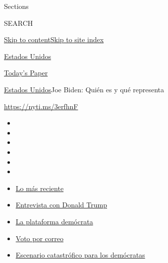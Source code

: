 Sections

SEARCH

\protect\hyperlink{site-content}{Skip to
content}\protect\hyperlink{site-index}{Skip to site index}

\href{https://www.nytimes3xbfgragh.onion/es/section/estados-unidos}{Estados
Unidos}

\href{https://myaccount.nytimes3xbfgragh.onion/auth/login?response_type=cookie\&client_id=vi}{}

\href{https://www.nytimes3xbfgragh.onion/section/todayspaper}{Today's
Paper}

\href{/es/section/estados-unidos}{Estados Unidos}\textbar{}Joe Biden:
Quién es y qué representa

\url{https://nyti.ms/3erfhnF}

\begin{itemize}
\item
\item
\item
\item
\item
\item
\end{itemize}

\begin{itemize}
\item
  \href{https://www.nytimes3xbfgragh.onion/es/2020/09/07/espanol/estados-unidos/trump-biden-encuestas-elecciones.html?action=click\&pgtype=Article\&state=default\&region=TOP_BANNER\&context=storylines_menu}{Lo
  más reciente}
\item
  \href{https://www.nytimes3xbfgragh.onion/es/2020/08/31/espanol/estados-unidos/donald-trump.html?action=click\&pgtype=Article\&state=default\&region=TOP_BANNER\&context=storylines_menu}{Entrevista
  con Donald Trump}
\item
  \href{https://www.nytimes3xbfgragh.onion/es/2020/08/21/espanol/estados-unidos/plataforma-democratas-espanol.html?action=click\&pgtype=Article\&state=default\&region=TOP_BANNER\&context=storylines_menu}{La
  plataforma demócrata}
\item
  \href{https://www.nytimes3xbfgragh.onion/es/article/voto-por-correo.html?action=click\&pgtype=Article\&state=default\&region=TOP_BANNER\&context=storylines_menu}{Voto
  por correo}
\item
  \href{https://www.nytimes3xbfgragh.onion/es/2020/09/04/espanol/estados-unidos/elecciones-estados-unidos.html?action=click\&pgtype=Article\&state=default\&region=TOP_BANNER\&context=storylines_menu}{Escenario
  catastrófico para los demócratas}
\end{itemize}

